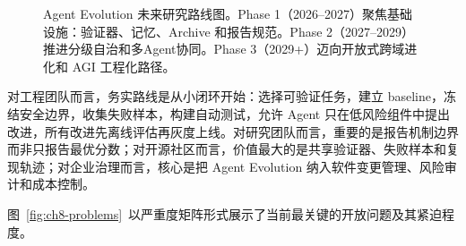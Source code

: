 \begin{figure}[htbp]
\caption{Agent Evolution 未来研究路线图。Phase 1（2026--2027）聚焦基础设施：验证器、记忆、Archive 和报告规范。Phase 2（2027--2029）推进分级自治和多Agent协同。Phase 3（2029+）迈向开放式跨域进化和 AGI 工程化路径。}
\label{fig:ch8-roadmap}
\end{figure}

对工程团队而言，务实路线是从小闭环开始：选择可验证任务，建立 baseline，冻结安全边界，收集失败样本，构建自动测试，允许 Agent 只在低风险组件中提出改进，所有改进先离线评估再灰度上线。对研究团队而言，重要的是报告机制边界而非只报告最优分数；对开源社区而言，价值最大的是共享验证器、失败样本和复现轨迹；对企业治理而言，核心是把 Agent Evolution 纳入软件变更管理、风险审计和成本控制。

图~\ref{fig:ch8-problems}~以严重度矩阵形式展示了当前最关键的开放问题及其紧迫程度。

